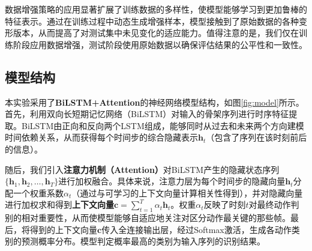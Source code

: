 \documentclass[UTF8]{article}
\begin{document}
数据增强策略的应用显著扩展了训练数据的多样性，使模型能够学习到更加鲁棒的特征表示。通过在训练过程中动态生成增强样本，模型接触到了原始数据的各种变形版本，从而提高了对测试集中未见变化的适应能力。值得注意的是，我们仅在训练阶段应用数据增强，测试阶段使用原始数据以确保评估结果的公平性和一致性。

\subsection{模型结构}

本实验采用了\textbf{BiLSTM+Attention}的神经网络模型结构，如图\ref{fig:model}所示。首先，利用双向长短期记忆网络（BiLSTM）对输入的骨架序列进行时序特征提取。BiLSTM由正向和反向两个LSTM组成，能够同时从过去和未来两个方向建模时间依赖关系，从而获得每个时间步的综合隐藏表示$\mathbf{h}_t$（包含了序列在该时刻前后的信息）。

随后，我们引入\textbf{注意力机制（Attention）}对BiLSTM产生的隐藏状态序列$\{\mathbf{h}_1, \mathbf{h}_2, \dots, \mathbf{h}_T\}$进行加权融合。具体来说，注意力层为每个时间步的隐藏向量$\mathbf{h}_t$分配一个权重系数$\alpha_t$（通过与可学习的上下文向量计算相关性得到），并对隐藏向量进行加权求和得到\textbf{上下文向量}$\mathbf{c}=\sum_{t=1}^{T} \alpha_t \mathbf{h}_t$。权重$\alpha_t$反映了时刻$t$对最终动作判别的相对重要性，从而使模型能够自适应地关注对区分动作最关键的那些帧。最后，将得到的上下文向量$\mathbf{c}$传入全连接输出层，经过Softmax激活，生成各动作类别的预测概率分布。模型判定概率最高的类别为输入序列的识别结果。
\end{document}
